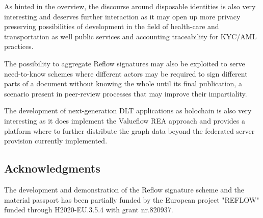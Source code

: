 \documentclass[twocolumn]{article}
\begin{document}
As hinted in the overview, the discourse around disposable identities
is also very interesting and deserves further interaction as it may
open up more privacy preserving possibilities of development in the
field of health-care and transportation as well public services and
accounting traceability for KYC/AML practices.

The possibility to aggregate Reflow signatures may also be exploited
to serve need-to-know schemes where different actors may be required
to sign different parts of a document without knowing the whole until
its final publication, a scenario present in peer-review processes
that may improve their impartiality.

The development of next-generation DLT applications as holochain is
also very interesting as it does implement the Valueflow REA approach
and provides a platform where to further distribute the graph data
beyond the federated server provision currently implemented.

\subsection{Acknowledgments}

The development and demonstration of the Reflow signature scheme and
the material passport has been partially funded by the European
project "REFLOW" funded through H2020-EU.3.5.4 with grant nr.820937.





\listoffigures



\end{document}
